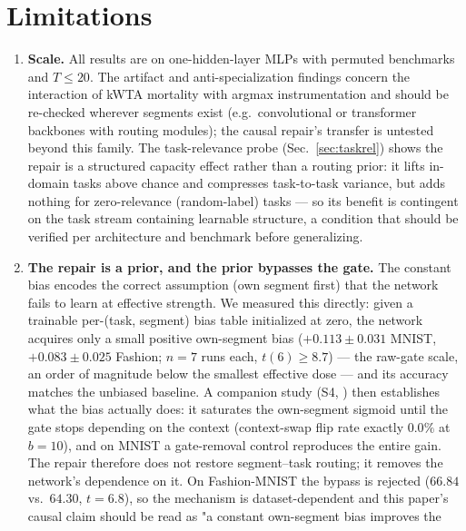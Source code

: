 \documentclass[review,12pt,number]{elsarticle}
\begin{document}
\section{Limitations}
\label{sec:limitations}

\begin{enumerate}
\item \textbf{Scale.} All results are on one-hidden-layer MLPs with
      permuted benchmarks and $T \le 20$. The artifact and
      anti-specialization findings concern the interaction of kWTA
      mortality with argmax instrumentation and should be re-checked
      wherever segments exist (e.g.\ convolutional or transformer backbones
      with routing modules); the causal repair's transfer is untested
      beyond this family. The task-relevance probe
      (Sec.~\ref{sec:taskrel}) shows the repair is a structured capacity
      effect rather than a routing prior: it lifts in-domain tasks above
      chance and compresses task-to-task variance, but adds nothing for
      zero-relevance (random-label) tasks --- so its benefit is
      contingent on the task stream containing learnable structure, a
      condition that should be verified per architecture and benchmark
      before generalizing.
\item \textbf{The repair is a prior, and the prior bypasses the gate.}
      The constant bias
      encodes the correct assumption (own segment first) that the network
      fails to learn at effective strength. We measured this directly:
      given a trainable per-(task, segment) bias table initialized at
      zero, the network acquires only a small positive own-segment bias
      ($+0.113 \pm 0.031$ MNIST, $+0.083 \pm 0.025$ Fashion; $n{=}7$
      runs each, $t(6) \ge 8.7$) --- the raw-gate scale, an order of
      magnitude below the smallest effective dose --- and its accuracy
      matches the unbiased baseline. A companion study
      (S4, \cite{zhou2026bypass}) then establishes what the bias actually
      does: it saturates the own-segment sigmoid until the gate stops
      depending on the context (context-swap flip rate exactly $0.0\%$ at
      $b{=}10$), and on MNIST a gate-removal control reproduces the entire
      gain. The repair therefore does not restore segment--task routing;
      it removes the network's dependence on it. On Fashion-MNIST the
      bypass is rejected ($66.84$ vs.\ $64.30$, $t{=}6.8$), so the
      mechanism is dataset-dependent and this paper's causal claim
      should be read as "a constant own-segment bias improves the

\end{enumerate}
\end{document}
